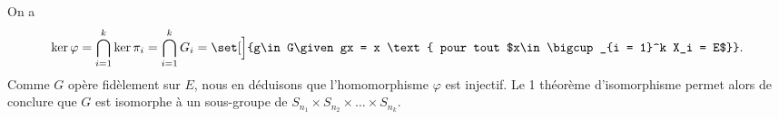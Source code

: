 On a
\[
  \ker \varphi = \bigcap_{i = 1}^k \ker \pi_i 
               = \bigcap_{i = 1}^k G_i = \set[\Big]{g\in G\given gx 
               = x \text{ pour tout $x\in\bigcup_{i = 1}^k X_i = E$}}.
\]
Comme $G$ opère fidèlement sur $E$, nous en déduisons que l'homomorphisme $\varphi$ est injectif.
Le 1\ier{} théorème d'isomorphisme permet alors de conclure que $G$ est isomorphe à un sous-groupe de $S_{n_1}\times S_{n_2}\times\dots\times S_{n_k}$.
